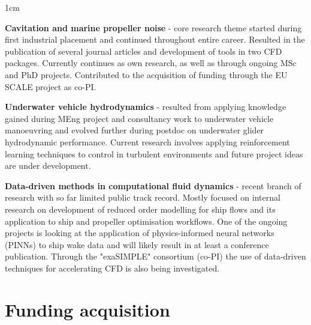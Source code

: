 \documentclass[a4paper,10pt]{article}
\begin{document}
\begin{minipage}{\textwidth}
\begin{adjustwidth}{}{1cm}

\textbf{Cavitation and marine propeller noise} - core research theme started during first industrial placement and continued throughout entire career. Resulted in the publication of several journal articles and development of tools in two CFD packages. Currently continues as own research, as well as through ongoing MSc and PhD projects. Contributed to the acquisition of funding through the EU SCALE project as co-PI.
\vspace{6pt}

\textbf{Underwater vehicle hydrodynamics} - resulted from applying knowledge gained during MEng project and consultancy work to underwater vehicle manoeuvring and evolved further during postdoc on underwater glider hydrodynamic performance. Current research involves applying reinforcement learning techniques to control in turbulent environments and future project ideas are under development.
\vspace{6pt}

\textbf{Data-driven methods in computational fluid dynamics} - recent branch of research with so far limited public track record. Mostly focused on internal research on development of reduced order modelling for ship flows and its application to ship and propeller optimisation workflows. One of the ongoing projects is looking at the application of physics-informed neural networks (PINNs) to ship wake data and will likely result in at least a conference publication. Through the "exaSIMPLE" consortium (co-PI) the use of data-driven techniques for accelerating CFD is also being investigated.

\end{adjustwidth}
\end{minipage}


\section{Funding acquisition}
\end{document}
